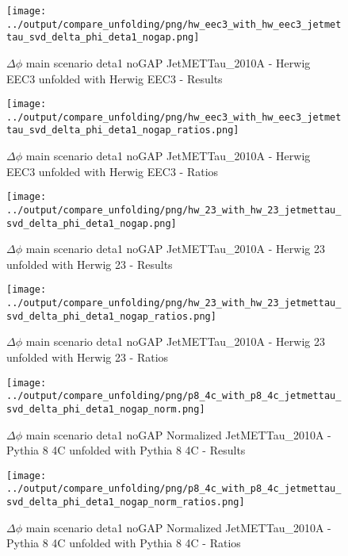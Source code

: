 \documentclass[11pt]{book}
\begin{document}
\begin{figure}[ht]
\centering
\texttt{[image: ../output/compare\_unfolding/png/hw\_eec3\_with\_hw\_eec3\_jetmettau\_svd\_delta\_phi\_deta1\_nogap.png]}
\caption{$\Delta\phi$ main scenario deta1 noGAP JetMETTau\_2010A - Herwig EEC3 unfolded with Herwig EEC3 - Results}
\label{hw_eec3_hw_eec3_jetmettau_svd_delta_phi_deta1_nogap_a}
\end{figure}

\begin{figure}[ht]
\centering
\texttt{[image: ../output/compare\_unfolding/png/hw\_eec3\_with\_hw\_eec3\_jetmettau\_svd\_delta\_phi\_deta1\_nogap\_ratios.png]}
\caption{$\Delta\phi$ main scenario deta1 noGAP JetMETTau\_2010A - Herwig EEC3 unfolded with Herwig EEC3 - Ratios}
\label{hw_eec3_hw_eec3_jetmettau_svd_delta_phi_deta1_nogap_b}
\end{figure}

\begin{figure}[ht]
\centering
\texttt{[image: ../output/compare\_unfolding/png/hw\_23\_with\_hw\_23\_jetmettau\_svd\_delta\_phi\_deta1\_nogap.png]}
\caption{$\Delta\phi$ main scenario deta1 noGAP JetMETTau\_2010A - Herwig 23 unfolded with Herwig 23 - Results}
\label{hw_23_hw_23_jetmettau_svd_delta_phi_deta1_nogap_a}
\end{figure}

\begin{figure}[ht]
\centering
\texttt{[image: ../output/compare\_unfolding/png/hw\_23\_with\_hw\_23\_jetmettau\_svd\_delta\_phi\_deta1\_nogap\_ratios.png]}
\caption{$\Delta\phi$ main scenario deta1 noGAP JetMETTau\_2010A - Herwig 23 unfolded with Herwig 23 - Ratios}
\label{hw_23_hw_23_jetmettau_svd_delta_phi_deta1_nogap_b}
\end{figure}



\begin{figure}[ht]
\centering
\texttt{[image: ../output/compare\_unfolding/png/p8\_4c\_with\_p8\_4c\_jetmettau\_svd\_delta\_phi\_deta1\_nogap\_norm.png]}
\caption{$\Delta\phi$ main scenario deta1 noGAP Normalized JetMETTau\_2010A - Pythia 8 4C unfolded with Pythia 8 4C - Results}
\label{p8_p8_jetmettau_svd_delta_phi_deta1_nogap_norm_a}
\end{figure}

\begin{figure}[ht]
\centering
\texttt{[image: ../output/compare\_unfolding/png/p8\_4c\_with\_p8\_4c\_jetmettau\_svd\_delta\_phi\_deta1\_nogap\_norm\_ratios.png]}
\caption{$\Delta\phi$ main scenario deta1 noGAP Normalized JetMETTau\_2010A - Pythia 8 4C unfolded with Pythia 8 4C - Ratios}
\label{p8_p8_jetmettau_svd_delta_phi_deta1_nogap_norm_b}
\end{figure}
\end{document}

